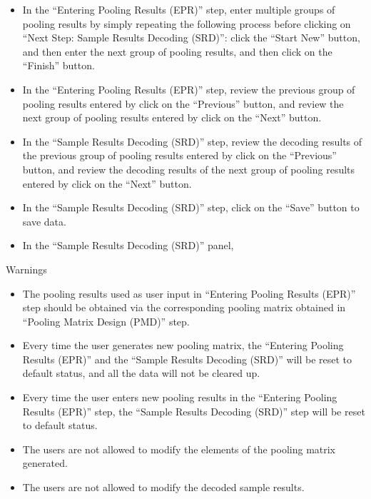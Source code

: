 \documentclass{article}
\theoremstyle{remark}
\begin{document}
\begin{itemize}
\item In the ``Entering Pooling Results (EPR)'' step, enter multiple groups of pooling results by simply repeating the following process before clicking on ``Next Step: Sample Results Decoding (SRD)'': click the ``Start New'' button, and then enter the next group of pooling results, and then click on the ``Finish'' button.

\item In the ``Entering Pooling Results (EPR)'' step, review the previous group of pooling results entered by click on the ``Previous'' button, and review the next group of pooling results entered by click on the ``Next'' button.

\item In the ``Sample Results Decoding (SRD)'' step, review the decoding results of the previous group of pooling results entered by click on the ``Previous'' button, and review the decoding results of the next group of pooling results entered by click on the ``Next'' button.

\item In the ``Sample Results Decoding (SRD)'' step, click on the ``Save'' button to save data. 

\item In the ``Sample Results Decoding (SRD)'' panel, 

\end{itemize}

Warnings

\begin{itemize}

\item The pooling results used as user input in ``Entering Pooling Results (EPR)'' step should be obtained via the corresponding pooling matrix obtained in ``Pooling Matrix Design (PMD)'' step.

\item Every time the user generates new pooling matrix, the ``Entering Pooling Results (EPR)'' and the ``Sample Results Decoding (SRD)'' will be reset to default status, and all the data will not be cleared up.

\item Every time the user enters new pooling results in the ``Entering Pooling Results (EPR)'' step, the ``Sample Results Decoding (SRD)'' step will be reset to default status.

\item The users are not allowed to modify the elements of the pooling matrix generated. 

\item The users are not allowed to modify the decoded sample results. 


\end{itemize}
\end{document}
